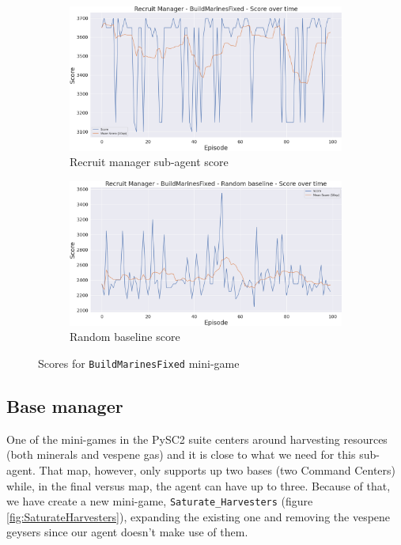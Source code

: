 \begin{figure}[t]
    \centering
    \begin{subfigure}[b]{0.48\textwidth}
        \includegraphics[width=1\textwidth]{figs/multi_dqn_army_recruit_manager/exploit/score.png}
        \caption{Recruit manager sub-agent score}
    \end{subfigure}
    \hfill
    \begin{subfigure}[b]{0.48\textwidth}
        \includegraphics[width=1\textwidth]{figs/multi_random_army_recruit_manager/exploit/score.png}
        \caption{Random baseline score}
    \end{subfigure}
    \caption{Scores for \texttt{BuildMarinesFixed} mini-game}
    \label{fig:BuildMarinesFixed_scores}
\end{figure}

\subsection{Base manager}

One of the mini-games in the PySC2 suite centers around harvesting resources (both minerals and vespene gas) and it is close to what we need for this sub-agent. That map, however, only supports up two bases (two Command Centers) while, in the final versus map, the agent can have up to three. Because of that, we have create a new mini-game, \texttt{Saturate\_Harvesters} (figure \ref{fig:SaturateHarvesters}), expanding the existing one and removing the vespene geysers since our agent doesn't make use of them.

